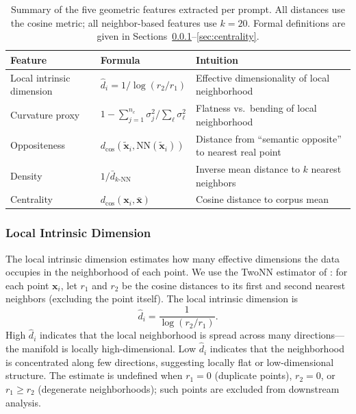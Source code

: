 \begin{table}[ht]
\centering
\small
\begin{tabular}{llp{5.5cm}}
\toprule
\textbf{Feature} & \textbf{Formula} & \textbf{Intuition} \\
\midrule
Local intrinsic dimension & $\hat{d}_i = 1 / \log(r_2/r_1)$ & Effective dimensionality of local neighborhood \\
Curvature proxy & $1 - \sum_{j=1}^{n_c} \sigma_j^2 / \sum_\ell \sigma_\ell^2$ & Flatness vs.\ bending of local neighborhood \\
Oppositeness & $d_{\cos}(\tilde{\mathbf{x}}_i, \text{NN}(\tilde{\mathbf{x}}_i))$ & Distance from ``semantic opposite'' to nearest real point \\
Density & $1 / \bar{d}_{k\text{-NN}}$ & Inverse mean distance to $k$ nearest neighbors \\
Centrality & $d_{\cos}(\mathbf{x}_i, \bar{\mathbf{x}})$ & Cosine distance to corpus mean \\
\bottomrule
\end{tabular}
\caption{Summary of the five geometric features extracted per prompt. All distances use the cosine metric; all neighbor-based features use $k = 20$. Formal definitions are given in Sections~\ref{sec:local-id}--\ref{sec:centrality}.}
\label{tab:features}
\end{table}

\subsubsection{Local Intrinsic Dimension}
\label{sec:local-id}

The local intrinsic dimension estimates how many effective dimensions the data occupies in the neighborhood of each point. We use the TwoNN estimator of \citet{facco2017twonn}: for each point $\mathbf{x}_i$, let $r_1$ and $r_2$ be the cosine distances to its first and second nearest neighbors (excluding the point itself). The local intrinsic dimension is
\begin{equation}
\hat{d}_i = \frac{1}{\log(r_2 / r_1)}.
\label{eq:twonn}
\end{equation}
High $\hat{d}_i$ indicates that the local neighborhood is spread across many directions---the manifold is locally high-dimensional. Low $\hat{d}_i$ indicates that the neighborhood is concentrated along few directions, suggesting locally flat or low-dimensional structure. The estimate is undefined when $r_1 = 0$ (duplicate points), $r_2 = 0$, or $r_1 \geq r_2$ (degenerate neighborhoods); such points are excluded from downstream analysis.

